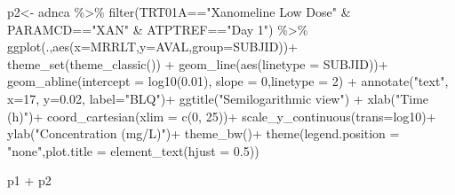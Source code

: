 \documentclass[
  letterpaper,
  DIV=11,
  numbers=noendperiod]{scrreprt}
\newenvironment{Shaded}{\begin{snugshade}}{\end{snugshade}}
\newcommand{\AttributeTok}[1]{\textcolor[rgb]{0.40,0.45,0.13}{#1}}
\newcommand{\DecValTok}[1]{\textcolor[rgb]{0.68,0.00,0.00}{#1}}
\newcommand{\FloatTok}[1]{\textcolor[rgb]{0.68,0.00,0.00}{#1}}
\newcommand{\FunctionTok}[1]{\textcolor[rgb]{0.28,0.35,0.67}{#1}}
\newcommand{\NormalTok}[1]{\textcolor[rgb]{0.00,0.23,0.31}{#1}}
\newcommand{\OtherTok}[1]{\textcolor[rgb]{0.00,0.23,0.31}{#1}}
\newcommand{\SpecialCharTok}[1]{\textcolor[rgb]{0.37,0.37,0.37}{#1}}
\newcommand{\StringTok}[1]{\textcolor[rgb]{0.13,0.47,0.30}{#1}}
\begin{document}
\begin{Shaded}
\begin{Highlighting}[]
\NormalTok{p2}\OtherTok{\textless{}{-}}\NormalTok{ adnca }\SpecialCharTok{\%\textgreater{}\%} 
  \FunctionTok{filter}\NormalTok{(TRT01A}\SpecialCharTok{==}\StringTok{"Xanomeline Low Dose"} \SpecialCharTok{\&} 
\NormalTok{        PARAMCD}\SpecialCharTok{==}\StringTok{"XAN"} \SpecialCharTok{\&}\NormalTok{ ATPTREF}\SpecialCharTok{==}\StringTok{"Day 1"}\NormalTok{) }\SpecialCharTok{\%\textgreater{}\%}
  \FunctionTok{ggplot}\NormalTok{(.,}\FunctionTok{aes}\NormalTok{(}\AttributeTok{x=}\NormalTok{MRRLT,}\AttributeTok{y=}\NormalTok{AVAL,}\AttributeTok{group=}\NormalTok{SUBJID))}\SpecialCharTok{+}
  \FunctionTok{theme\_set}\NormalTok{(}\FunctionTok{theme\_classic}\NormalTok{()) }\SpecialCharTok{+}
  \FunctionTok{geom\_line}\NormalTok{(}\FunctionTok{aes}\NormalTok{(}\AttributeTok{linetype =}\NormalTok{ SUBJID))}\SpecialCharTok{+}
  \FunctionTok{geom\_abline}\NormalTok{(}\AttributeTok{intercept =} \FunctionTok{log10}\NormalTok{(}\FloatTok{0.01}\NormalTok{), }\AttributeTok{slope =} \DecValTok{0}\NormalTok{,}\AttributeTok{linetype =} \DecValTok{2}\NormalTok{) }\SpecialCharTok{+}
  \FunctionTok{annotate}\NormalTok{(}\StringTok{"text"}\NormalTok{, }\AttributeTok{x=}\DecValTok{17}\NormalTok{, }\AttributeTok{y=}\FloatTok{0.02}\NormalTok{, }\AttributeTok{label=}\StringTok{"BLQ"}\NormalTok{)}\SpecialCharTok{+}
  \FunctionTok{ggtitle}\NormalTok{(}\StringTok{"Semilogarithmic view"}\NormalTok{) }\SpecialCharTok{+}
  \FunctionTok{xlab}\NormalTok{(}\StringTok{"Time (h)"}\NormalTok{)}\SpecialCharTok{+}
  \FunctionTok{coord\_cartesian}\NormalTok{(}\AttributeTok{xlim =} \FunctionTok{c}\NormalTok{(}\DecValTok{0}\NormalTok{, }\DecValTok{25}\NormalTok{))}\SpecialCharTok{+}
  \FunctionTok{scale\_y\_continuous}\NormalTok{(}\AttributeTok{trans=}\StringTok{\textquotesingle{}log10\textquotesingle{}}\NormalTok{)}\SpecialCharTok{+}
  \FunctionTok{ylab}\NormalTok{(}\StringTok{"Concentration (mg/L)"}\NormalTok{)}\SpecialCharTok{+}
  \FunctionTok{theme\_bw}\NormalTok{()}\SpecialCharTok{+} 
  \FunctionTok{theme}\NormalTok{(}\AttributeTok{legend.position =} \StringTok{"none"}\NormalTok{,}\AttributeTok{plot.title =} \FunctionTok{element\_text}\NormalTok{(}\AttributeTok{hjust =} \FloatTok{0.5}\NormalTok{))}

\NormalTok{p1 }\SpecialCharTok{+}\NormalTok{ p2}
\end{Highlighting}
\end{Shaded}
\end{document}

